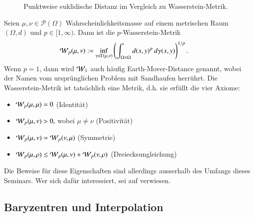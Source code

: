 \begin{figure}
\centering

\caption{Punktweise euklidische Distanz im Vergleich zu Wasserstein-Metrik.}
\label{mongekant:fig:wasserstein}
\end{figure}

Seien $\mu, \nu \in \mathcal{P}(\Omega)$ Wahrscheinlichkeitsmasse
auf einem metrischen Raum $(\Omega, d)$ und $p \in [1, \infty)$.
Dann ist die $p$-Wasserstein-Metrik
\begin{align}
\wasserstein(\mu, \nu)
&:=
\inf_{\gamma \in \Gamma(\mu, \nu)}
\left(
\int_{\Omega \times \Omega} d(x,y)^p\, d\gamma(x,y)
\right)^{1/p}
.
\label{mongekant:eq:wasserstein_metric}
\end{align}
Wenn $p=1$,
dann wird $\wasserstein[1]$ auch häufig Earth-Mover-Distance genannt,
%
wobei der Namen vom ursprünglichen Problem mit Sandhaufen herrührt.
Die Wasserstein-Metrik ist tatsächlich eine Metrik,
d.h. sie erfüllt die vier Axiome:
\begin{itemize}
\item $\wasserstein(\mu, \mu) = 0$ (Identität)
\item $\wasserstein(\mu, \nu) > 0,$ wobei $\mu \neq \nu$ (Positivität)
\item $\wasserstein(\mu, \nu) = \wasserstein(\nu, \mu)$ (Symmetrie)
\item $\wasserstein(\mu, \rho) \leq \wasserstein(\mu, \nu) + \wasserstein(\nu, \rho)$
(Dreiecksungleichung)
\end{itemize}
Die Beweise für diese Eigenschaften sind allerdings
ausserhalb des Umfangs dieses Seminars.
Wer sich dafür interessiert,
sei auf \cite{mongekant:villani} verwiesen.

\subsection{Baryzentren und Interpolation
\label{mongekant:subsection:interpolation}}

